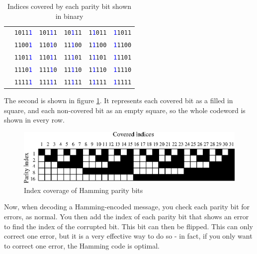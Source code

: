 \documentclass[a4paper,11pt]{article}
\begin{document}
\begin{table}[H]
\begin{center}
\begin{tabular}{l|rrrrr}
    & \texttt{1011\textcolor{blue}{1}} & \texttt{101\textcolor{blue}{1}1} & \texttt{10\textcolor{blue}{1}11} & \texttt{1\textcolor{blue}{1}011} & \texttt{\textcolor{blue}{1}1011} \\
    & \texttt{1100\textcolor{blue}{1}} & \texttt{110\textcolor{blue}{1}0} & \texttt{11\textcolor{blue}{1}00} & \texttt{1\textcolor{blue}{1}100} & \texttt{\textcolor{blue}{1}1100} \\
    & \texttt{1101\textcolor{blue}{1}} & \texttt{110\textcolor{blue}{1}1} & \texttt{11\textcolor{blue}{1}01} & \texttt{1\textcolor{blue}{1}101} & \texttt{\textcolor{blue}{1}1101} \\
    & \texttt{1110\textcolor{blue}{1}} & \texttt{111\textcolor{blue}{1}0} & \texttt{11\textcolor{blue}{1}10} & \texttt{1\textcolor{blue}{1}110} & \texttt{\textcolor{blue}{1}1110} \\
    & \texttt{1111\textcolor{blue}{1}} & \texttt{111\textcolor{blue}{1}1} & \texttt{11\textcolor{blue}{1}11} & \texttt{1\textcolor{blue}{1}111} & \texttt{\textcolor{blue}{1}1111} \\
    \bottomrule
    \end{tabular}
    \caption{Indices covered by each parity bit shown in binary}\label{tab:hamming-binary}
\end{center}
\end{table}

    The second is shown in figure \ref{fig:hamming}. It represents each covered
    bit as a filled in square, and each non-covered bit as an empty square, so
    the whole codeword is shown in every row.

\begin{figure}[H]
\begin{center}
\includegraphics{../psfiles/hamming_visualisation.eps}
\end{center}
\caption{Index coverage of Hamming parity bits}\label{fig:hamming}
\end{figure}

    Now, when decoding a Hamming-encoded message, you check each parity bit for
    errors, as normal. You then add the index of each parity bit that shows an
    error to find the index of the corrupted bit. This bit can then be flipped.
    This can only correct one error, but it is a very effective way to do so -
    in fact, if you only want to correct one error, the Hamming code is optimal.
\end{document}
